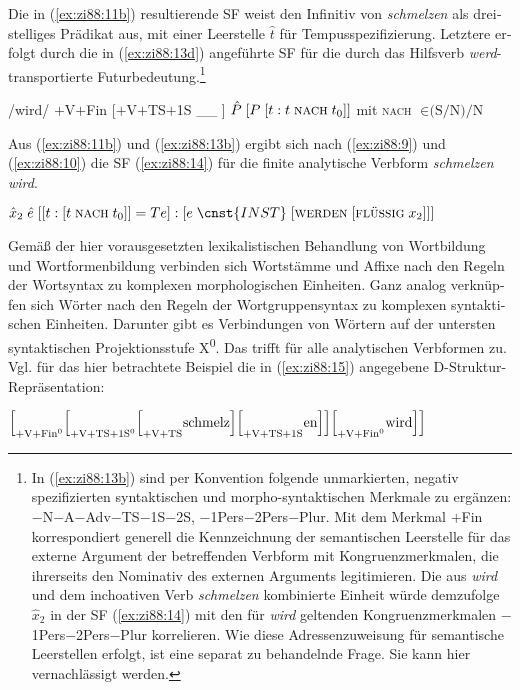 \documentclass[output=paper,colorlinks,citecolor=brown, booklanguage=german]{langscibook}
\begin{document}
\begin{otherlanguage}{german}
\noindent Die in (\ref{ex:zi88:11b}) resultierende SF weist den Infinitiv von \textit{schmelzen} als dreistelliges Prädikat aus, mit einer Leerstelle $\hat{t}$ für Tempusspezifizierung. Letztere erfolgt durch die in (\ref{ex:zi88:13d}) angeführte SF für die durch das Hilfsverb \textit{werd}- transportierte Futurbedeutung.\footnote{In (\ref{ex:zi88:13b}) sind per Konvention folgende unmarkierten, negativ spezifizierten syntaktischen und morpho-syntaktischen Merkmale zu ergänzen: $-$N$-$A$-$Adv$-$TS$-$1S$-$2S, $-$1Pers$-$2Pers$-$Plur. Mit dem Merkmal $+$Fin korrespondiert generell die Kennzeichnung der semantischen Leerstelle für das externe Argument der betreffenden Verbform mit Kongruenzmerkmalen, die ihrerseits den Nominativ des externen Arguments legitimieren. Die aus \textit{wird} und dem inchoativen Verb \textit{schmelzen} kombinierte Einheit würde demzufolge $\hat{x}_2$ in der SF (\ref{ex:zi88:14}) mit den für \textit{wird} geltenden Kongruenzmerkmalen $-$1Pers$-$2Pers$-$Plur korrelieren. Wie diese Adressenzuweisung für semantische Leerstellen erfolgt, ist eine separat zu behandelnde Frage. Sie kann hier vernachlässigt werden.}

\ea\label{ex:zi88:13}
    \ea\label{ex:zi88:13a} /wird/
    \ex\label{ex:zi88:13b} $+$V$+$Fin
    \ex\label{ex:zi88:13c} [$+$V$+$TS$+$1S \_\_ ]
    \ex\label{ex:zi88:13d} $\hat{P} \; [P \;[t:t \; \textsc{nach} \; t_0]]$ \; \; mit \textsc{nach} $\in \text{(S/N)/N}$
\z\z 

\noindent Aus (\ref{ex:zi88:11b}) und (\ref{ex:zi88:13b}) ergibt sich nach (\ref{ex:zi88:9}) und (\ref{ex:zi88:10}) die SF (\ref{ex:zi88:14}) für die finite analytische Verbform \textit{schmelzen wird}.

\ea\label{ex:zi88:14} $\hat{x}_2 \; \hat{e} \; [[t : [t \; \textsc{nach} \; t_0]] = Te] : [e \; \cnst{INST} \; [\textsc{werden} \; [\textsc{flüssig} \; x_2]]]$
\z 

\noindent Gemäß der hier vorausgesetzten lexikalistischen Behandlung von Wortbildung und Wortformenbildung verbinden sich Wortstämme und Affixe nach den Regeln der Wortsyntax zu komplexen morphologischen Einheiten. Ganz analog verknüpfen sich Wörter nach den Regeln der Wortgruppensyntax zu komplexen syntaktischen Einheiten. Darunter gibt es Verbindungen von Wörtern auf der untersten syntaktischen Projektionsstufe X\textsuperscript{0}. Das trifft für alle analytischen Verbformen zu. Vgl. für das hier betrachtete Beispiel die in (\ref{ex:zi88:15}) angegebene D-Struktur-Repräsentation:

\ea\label{ex:zi88:15} $\Bigl[_{+\textrm{V}+\textrm{Fin}^0}\Bigl[_{+\textrm{V}+\textrm{TS}+\textrm{1S}^0}\Bigl[_{+\textrm{V}+\textrm{TS}} \textrm{schmelz}\Bigr] \newline \newline
\Bigl[_{+\textrm{V}+\textrm{TS}+\textrm{1S}} \textrm{en}\Bigr]\Bigr]\Bigl[_{+\textrm{V}+\textrm{Fin}^0} \textrm{wird}\Bigl]\Bigl]$
\z 


\end{otherlanguage}
\end{document}
